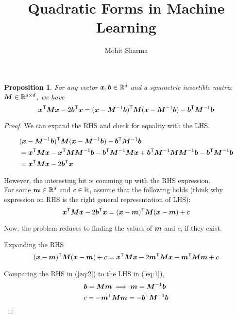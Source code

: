 \documentclass{article}
\title{Quadratic Forms in Machine Learning}
\author{Mohit Sharma}
\newtheorem{proposition}{Proposition}
\begin{document}
\maketitle

\begin{proposition}
For any vector ${\bm{x}}, {\bm{b}} \in \mathbb{R}^d$ and a symmetric invertible matrix ${\bm{M}} \in \mathbb{R}^{d \times d}$, we have
\[
    {\bm{x}}^{\mathsf{T}} {\bm{M}} {\bm{x}} -2{\bm{b}}^{\mathsf{T}}{\bm{x}} = ({\bm{x}} - {\bm{M}}^{-1}{\bm{b}})^{\mathsf{T}}{\bm{M}}({\bm{x}} - {\bm{M}}^{-1}{\bm{b}}) - {\bm{b}}^{\mathsf{T}} {\bm{M}}^{-1} {\bm{b}}
\]
\end{proposition}
\begin{proof}
    We can expand the RHS and check for equality with the LHS.

    \begin{equation*}
        \begin{split}
            & ({\bm{x}} - {\bm{M}}^{-1}{\bm{b}})^{\mathsf{T}}{\bm{M}}({\bm{x}} - {\bm{M}}^{-1}{\bm{b}}) - {\bm{b}}^{\mathsf{T}} {\bm{M}}^{-1} {\bm{b}} \\
            & = {\bm{x}}^{\mathsf{T}} {\bm{M}} {\bm{x}} - {\bm{x}}^{\mathsf{T}}{\bm{M}}{\bm{M}}^{-1} {\bm{b}} - {\bm{b}}^{\mathsf{T}}{\bm{M}}^{-1}{\bm{M}}{\bm{x}} + {\bm{b}}^{\mathsf{T}}{\bm{M}}^{-1} {\bm{M}} {\bm{M}}^{-1} {\bm{b}} - {\bm{b}}^{\mathsf{T}}{\bm{M}}^{-1} {\bm{b}} \\
            & =  {\bm{x}}^{\mathsf{T}} {\bm{M}} {\bm{x}} - 2{\bm{b}}^{\mathsf{T}}{\bm{x}}
        \end{split}
    \end{equation*}

    However, the interesting bit is comming up with the RHS expression.\\

    For some ${\bm{m}} \in \mathbb{R}^d$ and $c \in \mathbb{R}$, assume that the following holds (think why expression on RHS is the right general representation of LHS):
    \begin{equation}
        \label{eq:1}
        {\bm{x}}^{\mathsf{T}} {\bm{M}} {\bm{x}} -2{\bm{b}}^{\mathsf{T}}{\bm{x}} = ({\bm{x}} - {\bm{m}})^{\mathsf{T}} {\bm{M}} ({\bm{x}} -{\bm{m}}) + c
    \end{equation}

    Now, the problem reduces to finding the values of ${\bm{m}}$ and $c$, if they exist.

    Expanding the RHS
    \begin{equation}
        \label{eq:2}
        \begin{split}
            ({\bm{x}} - {\bm{m}})^{\mathsf{T}} {\bm{M}} ({\bm{x}} - {\bm{m}}) + c &= {\bm{x}}^{\mathsf{T}}{\bm{M}}{\bm{x}} -2 {\bm{m}}^{\mathsf{T}}{\bm{M}}{\bm{x}} + {\bm{m}}^{\mathsf{T}}{\bm{M}}{\bm{m}} + c \\
        \end{split}
    \end{equation}

    Comparing the RHS in (\ref{eq:2}) to the LHS in (\ref{eq:1}), 
    \begin{equation}
        \label{eq:3}
        \begin{split}
            &{\bm{b}} = {\bm{M}}{\bm{m}} \implies {\bm{m}} = {\bm{M}}^{-1}{\bm{b}} \\
            &c = - {\bm{m}}^{\mathsf{T}}{\bm{M}}{\bm{m}} = - {\bm{b}}^{\mathsf{T}}{\bm{M}}^{-1}{\bm{b}} \\
        \end{split}
    \end{equation}


\end{proof}
\end{document}
